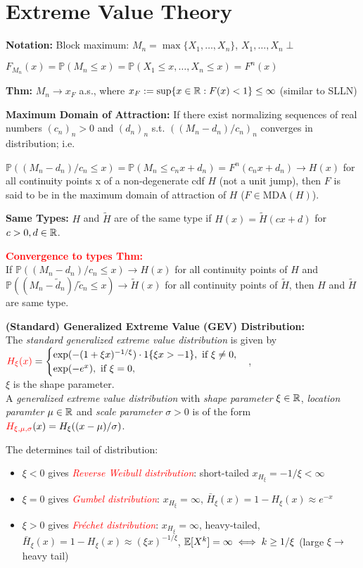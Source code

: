 \section*{Extreme Value Theory}
\textbf{Notation:}
Block maximum: $M_n=\max\{X_1,\dots,X_n\}$, $X_1,\dots,X_n\perp$

$F_{M_n}(x)=\mathbb{P}(M_n\leq x)=\mathbb{P}(X_1\leq x,\dots,X_n\leq x)=F^n(x)$

\textbf{Thm:} $M_n\rightarrow x_F$ a.s., where 
$x_F := \sup \{x\in\mathbb{R}:F(x)<1\}\leq \infty$ (similar to SLLN)

\textbf{Maximum Domain of Attraction:}
If there exist normalizing sequences of real numbers $(c_n)_n>0$ and $(d_n)_n$ s.t. $((M_n - d_n)/c_n)_n$ converges in distribution; i.e.

$\mathbb{P}((M_n - d_n)/c_n\leq x)=\mathbb{P}(M_n \leq c_n x + d_n)=F^n(c_n x + d_n)\rightarrow H(x)$ for all continuity points x of a non-degenerate cdf $H$ (not a unit jump),
then $F$ is said to be in the maximum domain of attraction of $H$ ($F\in \text{MDA}(H)$).

\textbf{Same Types:} $H$ and $\tilde{H}$ are of the same type if $H(x)=\tilde{H}(cx+d)$ for $c>0, d\in\mathbb{R}$.

\textcolor{red}{\textbf{Convergence to types Thm:}}\\
If $\mathbb{P}((M_n-d_n)/c_n\leq x)\rightarrow H(x)$ for all continuity points of $H$ and $\mathbb{P}((M_n-\tilde d_n)/\tilde c_n \leq x)\rightarrow \tilde H(x)$ for all continuity points of $\tilde H$, then $H$ and $\tilde H$ are same type. 

\textbf{(Standard) Generalized Extreme Value (GEV) Distribution:}\\
The \textit{standard generalized extreme value distribution} is given by\\
$\textcolor{red}{H_{\xi}(x)}=
\begin{cases}
\exp(-(1+\xi x)^{-1/\xi})\cdot 1\{\xi x> -1\},\text{ if }\xi\neq 0,\\
\exp(-e^x),\text{ if }\xi= 0,
\end{cases}$,\\$\xi$ is the shape parameter.\\
A \textit{generalized extreme value distribution} with \textit{shape parameter }$\xi\in\mathbb{R}$, \textit{location paramter} $\mu\in\mathbb{R}$ and \textit{scale parameter} $\sigma>0$ is of the form $\textcolor{red}{H_{\xi,\mu,\sigma}}(x)=H_{\xi}((x-\mu)/\sigma)$.

The  determines tail of distribution:
\begin{itemize}
    \item $\xi < 0$ gives \textcolor{red}{\textit{Reverse Weibull distribution}}: short-tailed $x_{H_{\xi}}=-1/\xi<\infty$
    \item $\xi = 0$ gives \textcolor{red}{\textit{Gumbel distribution}}: $x_{H_{\xi}}=\infty$, $\bar H_{\xi}(x) = 1-H_{\xi}(x)\approx e^{-x}$
    \item $\xi > 0$ gives \textcolor{red}{\textit{Fréchet distribution}}: $x_{H_\xi}=\infty$, heavy-tailed,
    $\bar H_\xi (x) = 1- H_\xi(x)\approx (\xi x)^{-1/\xi}$,
    $\mathbb{E}[X^k]=\infty \iff k\geq 1/\xi$ (large $\xi\rightarrow$ heavy tail)
\end{itemize}


